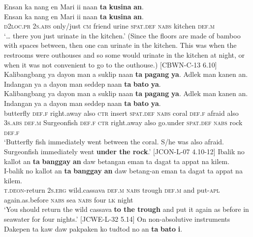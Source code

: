 \ea
Ensan  ka  nang  en  Mari  ii  naan  \textbf{ta}  \textbf{kusina}  \textbf{an}. \\\smallskip
 \gll Ensan  ka  nang  en  Mari  ii  naan  \textbf{ta}  \textbf{kusina}  \textbf{an}. \\
\textsc{d}2\textsc{loc.pr}  2\textsc{s.abs}  only/just  \textsc{cm}  friend  urine  \textsc{spat.def}  \textsc{nabs}  kitchen  \textsc{def.m} \\
\glt ‘… there you just urinate in the kitchen.’ (Since the floors are made of bamboo with spaces between, then one can urinate in the kitchen. This was when the restrooms were outhouses and so some would urinate in the kitchen at night, or when it was not convenient to go to the outhouse.) [CBWN-C-13 6.10]
\z
\ea
Kalibangbang  ya  dayon  man  a  suklip  naan  \textbf{ta}  \textbf{pagang}  \textbf{ya}. Adlek  man  kanen  an.  Indangan  ya  a  dayon  man  seddep naan  \textbf{ta}  \textbf{bato}  \textbf{ya}. \\\smallskip
 \gll Kalibangbang  ya  dayon  man  a  suklip  naan  \textbf{ta}  \textbf{pagang}  \textbf{ya}. Adlek  man  kanen  an.  Indangan  ya  a  dayon  man  seddep naan  \textbf{ta}  \textbf{bato}  \textbf{ya}. \\
butterfly    \textsc{def.f}  right.away  also  \textsc{ctr}  insert  \textsc{spat.def}  \textsc{nabs}  coral  \textsc{def.f}
afraid  also  3\textsc{s.abs}  \textsc{def.m}  Surgeonfish  \textsc{def.f}  \textsc{ctr}  right.away  also  go.under
\textsc{spat.def}  \textsc{nabs}  rock  \textsc{def.f} \\
\glt `Butterfly fish immediately went between the coral. S/he was also afraid. Surgeonfish immediately went \textbf{under the rock}.’ [JCON-L-07 4.10-12]
\z
\ea
\label{ex:night}
Ibalik	no	kallot	an	\textbf{ta}	\textbf{banggay}	\textbf{an}	daw	betangan eman	ta	dagat	ta	appat	na	kilem. \\\smallskip
 \gll I-balik	no	kallot	an	\textbf{ta}	\textbf{banggay}	\textbf{an}	daw	betang-an eman	ta	dagat	ta	appat	na	kilem. \\
\textsc{t.deon}-return	2\textsc{s.erg}	wild.cassava	\textsc{def.m}	\textsc{nabs}	trough	\textsc{def.m}	and		put-\textsc{apl}
again.as.before	\textsc{nabs}	sea	\textsc{nabs}	four	\textsc{lk}	night \\
\glt ‘You should return the wild cassava \textbf{to the trough} and put it again as before in seawater for four nights.’ [JCWE-L-32 5.14]
\z
\ea
On non-absolutive instruments \\
Dakepen	ta kaw	daw	pakpaken	ko	tudtod	no	an	\textbf{ta}	\textbf{bato}	\textbf{i}. \\\smallskip
